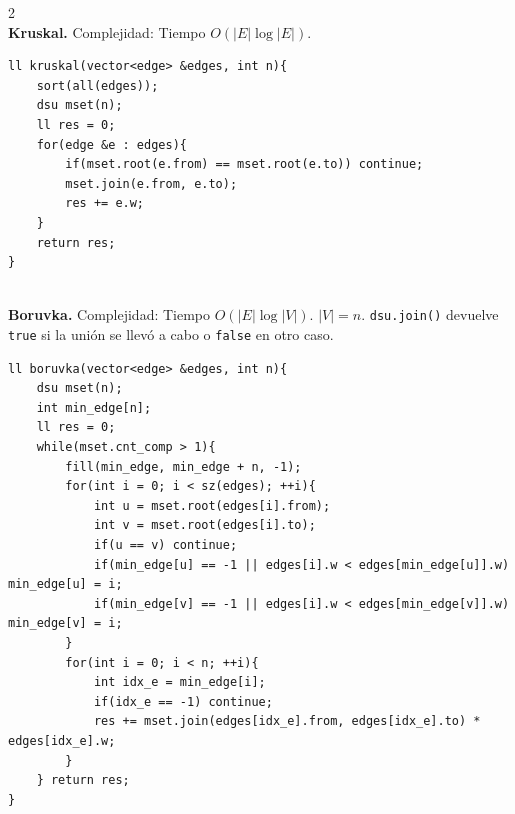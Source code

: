 \documentclass[10pt,spanish,mexico]{article}
\numberwithin{equation}{section}
\newcommand{\pa}[1]{\left( #1 \right)}
\begin{document}
\begin{multicols}{2}
\vspace{-1.2\baselineskip}
\hrulefill\\
\textbf{Kruskal.} Complejidad: Tiempo $O\pa{|E|\log |E|}$.
\begin{verbatim}
ll kruskal(vector<edge> &edges, int n){
    sort(all(edges));
    dsu mset(n);
    ll res = 0;
    for(edge &e : edges){
        if(mset.root(e.from) == mset.root(e.to)) continue;
        mset.join(e.from, e.to);
        res += e.w;
    }
    return res;
}
\end{verbatim}

\vspace{-1.2\baselineskip}
\hrulefill\\
\textbf{Boruvka.} Complejidad: Tiempo $O\pa{|E|\log |V|}$. $|V| = n$. \texttt{dsu.join()} devuelve \texttt{true} si la unión se llevó a cabo o \texttt{false} en otro caso.
\begin{verbatim}
ll boruvka(vector<edge> &edges, int n){
    dsu mset(n);
    int min_edge[n];
    ll res = 0;
    while(mset.cnt_comp > 1){
        fill(min_edge, min_edge + n, -1);
        for(int i = 0; i < sz(edges); ++i){
            int u = mset.root(edges[i].from);
            int v = mset.root(edges[i].to);
            if(u == v) continue;
            if(min_edge[u] == -1 || edges[i].w < edges[min_edge[u]].w) min_edge[u] = i;
            if(min_edge[v] == -1 || edges[i].w < edges[min_edge[v]].w) min_edge[v] = i;
        }
        for(int i = 0; i < n; ++i){
            int idx_e = min_edge[i];
            if(idx_e == -1) continue;
            res += mset.join(edges[idx_e].from, edges[idx_e].to) * edges[idx_e].w;
        }
    } return res;
}
\end{verbatim}


\end{multicols}
\end{document}
